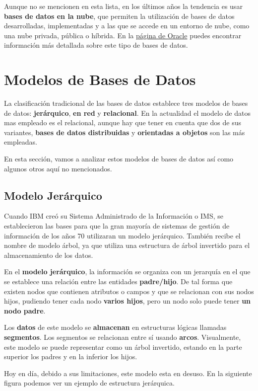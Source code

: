 Aunque no se mencionen en esta lista, en los últimos años la tendencia es usar \textbf{bases de datos en la nube}, que permiten la utilización de bases de datos desarrolladas, implementadas y a las que se accede en un entorno de nube, como una nube privada, pública o híbrida. \cite{cloud01} En la \href{https://www.oracle.com/es/database/what-is-a-cloud-database/}{página de Oracle} puedes encontrar información más detallada sobre este tipo de bases de datos.

\section{Modelos de Bases de Datos}
La clasificación tradicional de las bases de datos establece tres modelos de bases de datos: \textbf{jerárquico}, \textbf{en red} y \textbf{relacional}. En la actualidad el modelo de datos mas empleado es el relacional, aunque hay que tener en cuenta que dos de sus variantes, \textbf{bases de datos distribuidas} y \textbf{orientadas a objetos} son las más empleadas.

En esta sección, vamos a analizar estos modelos de bases de datos así como algunos otros aquí no mencionados.

\subsection{Modelo Jerárquico}
Cuando IBM creó su Sistema Administrado de la Información o IMS, se establecieron las bases para que la gran mayoría de sistemas de gestión de información de los años 70 utilizaran un modelo jerárquico. También recibe el nombre de modelo árbol, ya que utiliza una estructura de árbol invertido para el almacenamiento de los datos.

En el \textbf{modelo jerárquico}, la información se organiza con un jerarquía en el que se establece una relación entre las entidades \textbf{padre/hijo}. De tal forma que existen nodos que contienen atributos o campos y que se relacionan con sus nodos hijos, pudiendo tener cada nodo \textbf{varios hijos}, pero un nodo solo puede tener \textbf{un nodo padre}.

Los \textbf{datos} de este modelo se \textbf{almacenan} en estructuras lógicas llamadas \textbf{segmentos}. Los segmentos se relacionan entre sí usando \textbf{arcos}. Visualmente, este modelo se puede representar como un árbol invertido, estando en la parte superior los padres y en la inferior los hijos.

Hoy en día, debido a sus limitaciones, este modelo esta en desuso. En la siguiente figura podemos ver un ejemplo de estructura jerárquica.

